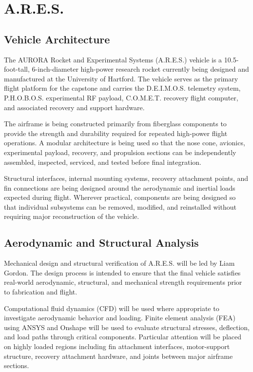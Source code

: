 \documentclass[11pt,twocolumn]{IEEEtran}
\newcommand{\comet}{C.O.M.E.T.}
\newcommand{\ares}{A.R.E.S.}
\newcommand{\phobos}{P.H.O.B.O.S.}
\newcommand{\deimos}{D.E.I.M.O.S.}
\begin{document}
\section{A.R.E.S.}

\subsection{Vehicle Architecture}

The AURORA Rocket and Experimental Systems (\ares{}) vehicle is a 10.5-foot-tall, 6-inch-diameter high-power research rocket currently being designed and manufactured at the University of Hartford. The vehicle serves as the primary flight platform for the capstone and carries the \deimos{} telemetry system, \phobos{} experimental RF payload, \comet{} recovery flight computer, and associated recovery and support hardware.

The airframe is being constructed primarily from fiberglass components to provide the strength and durability required for repeated high-power flight operations. A modular architecture is being used so that the nose cone, avionics, experimental payload, recovery, and propulsion sections can be independently assembled, inspected, serviced, and tested before final integration.

Structural interfaces, internal mounting systems, recovery attachment points, and fin connections are being designed around the aerodynamic and inertial loads expected during flight. Wherever practical, components are being designed so that individual subsystems can be removed, modified, and reinstalled without requiring major reconstruction of the vehicle.

\subsection{Aerodynamic and Structural Analysis}

Mechanical design and structural verification of \ares{} will be led by Liam Gordon. The design process is intended to ensure that the final vehicle satisfies real-world aerodynamic, structural, and mechanical strength requirements prior to fabrication and flight.

Computational fluid dynamics (CFD) will be used where appropriate to investigate aerodynamic behavior and loading. Finite element analysis (FEA) using ANSYS and Onshape will be used to evaluate structural stresses, deflection, and load paths through critical components. Particular attention will be placed on highly loaded regions including fin attachment interfaces, motor-support structure, recovery attachment hardware, and joints between major airframe sections.
\end{document}
